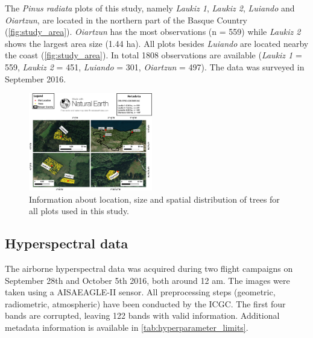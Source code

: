 \documentclass[letterpaper, peerreview]{IEEEtran}
\begin{document}
\noindent The \textit{Pinus radiata} plots of this study, namely \textit{Laukiz 1}, \textit{Laukiz 2}, \textit{Luiando} and \textit{Oiartzun}, are located in the northern part of the Basque Country (\autoref{fig:study_area}).
\textit{Oiartzun} has the most observations (n = 559) while \textit{Laukiz 2} shows the largest area size (1.44 ha).
All plots besides \textit{Luiando} are located nearby the coast (\autoref{fig:study_area}).
In total 1808 observations are available (\textit{Laukiz 1} = 559, \textit{Laukiz 2} = 451, \textit{Luiando} = 301, \textit{Oiartzun} = 497).
The data was surveyed in September 2016.

\begin{figure} [t!]
	\begin{center}
		\centering
		\includegraphics[width=0.48\textwidth] {study-area-hyperspectral.pdf}
		\caption{Information about location, size and spatial distribution of trees for all plots used in this study.}\label{fig:study_area}
	\end{center}
\end{figure}



\subsection{Hyperspectral data}

\noindent The airborne hyperspectral data was acquired during two flight campaigns on September 28th and October 5th 2016, both around 12 am.
The images were taken using a AISAEAGLE-II sensor.
All preprocessing steps (geometric, radiometric, atmospheric) have been conducted by the \ac{ICGC}.
The first four bands are corrupted, leaving 122 bands with valid information.
Additional metadata information is available in \autoref{tab:hyperparameter_limits}.
\end{document}
